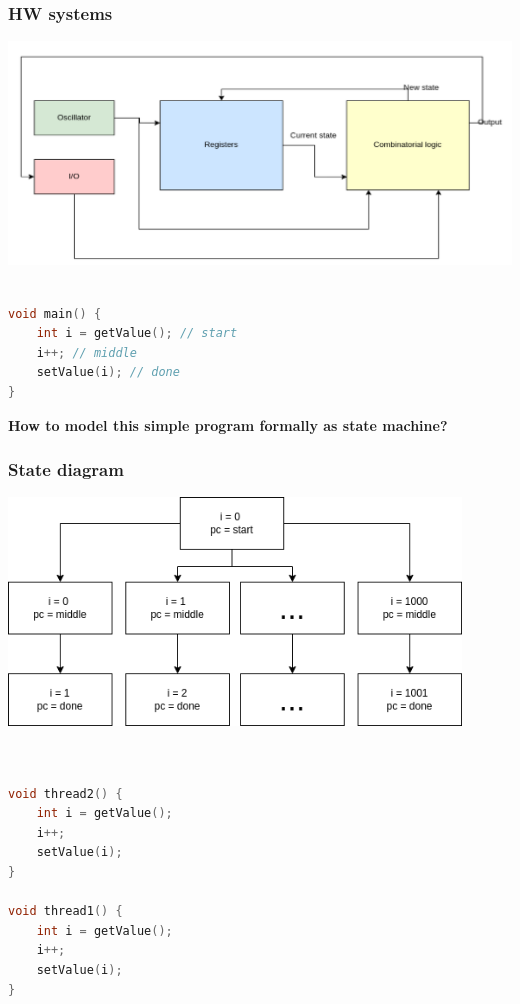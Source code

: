 \documentclass{beamer}
\begin{document}
\begin{frame}
    \frametitle{HW systems}
    \includegraphics[width=\textwidth]{./cpu.png}
\end{frame}


\begin{frame}[fragile]
	\begin{lstlisting}[language=C++]

void main() {
    int i = getValue(); // start
    i++; // middle
    setValue(i); // done
}

	\end{lstlisting}
	
\end{frame}

\begin{frame}
    \begin{center}
        \LARGE{\textbf{How to model this simple program formally as state machine?}}
    \end{center}

\end{frame}

\begin{frame}
    \frametitle{State diagram}
    \includegraphics[width=0.9\textwidth, height=0.9\textheight]{img/1.png}
\end{frame}


\begin{frame}[fragile]
	\begin{lstlisting}[language=C++]


void thread2() {
    int i = getValue();
    i++;
    setValue(i);
}

void thread1() {
    int i = getValue();
    i++;
    setValue(i);
}

	\end{lstlisting}
	
\end{frame}
\end{document}
